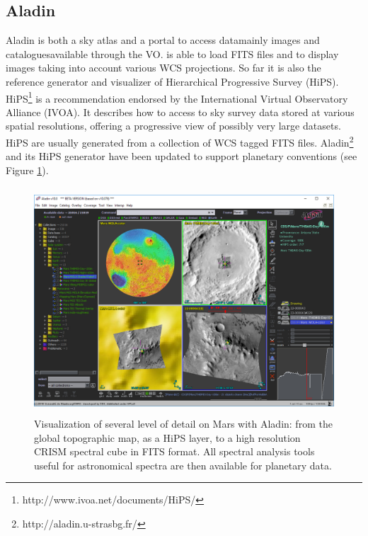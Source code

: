 \subsection{Aladin}
Aladin is both a sky atlas and a portal to access data\DIFdelbegin \DIFdel{-- }\DIFdelend \DIFaddbegin \DIFadd{, }\DIFaddend mainly images and
catalogues\DIFdelbegin \DIFdel{-- }\DIFdelend \DIFaddbegin \DIFadd{, }\DIFaddend available through the VO.
\DIFdelbegin {}\DIFdelend \DIFaddbegin {}\DIFaddend is able to load FITS files and to display images taking into account various
WCS projections.
\DIFdelbegin {}\DIFdelend So far it is also the reference generator and visualizer of Hierarchical
Progressive Survey (HiPS).
HiPS\footnote{http://www.ivoa.net/documents/HiPS/} is a recommendation endorsed
by the International Virtual Observatory Alliance (IVOA).
It describes how to access to sky survey data stored at various spatial
resolutions, offering a progressive view of possibly very large datasets.
HiPS are usually generated from a collection of WCS tagged FITS files.
Aladin\footnote{http://aladin.u-strasbg.fr/} \citep{aladin} and its HiPS generator have
been updated to support planetary conventions (see Figure \ref{fig:aladin}).

\begin{figure}[ht!]
\centerline{\includegraphics[height=20pc]{ess_marmo6}}
\caption{Visualization of several level of detail on Mars with Aladin: from the
global topographic map, as a HiPS layer, to a high resolution CRISM spectral cube
in FITS format. All spectral analysis tools useful for astronomical spectra
are then available for planetary data.}
\label{fig:aladin}
\end{figure}

